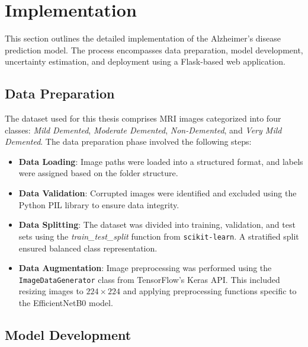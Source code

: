 \documentclass[12pt,onecolumn]{report}
\begin{document}
\section{Implementation}
\label{sec:implementation}

This section outlines the detailed implementation of the Alzheimer's disease prediction model. The process encompasses data preparation, model development, uncertainty estimation, and deployment using a Flask-based web application.

\subsection{Data Preparation}
The dataset used for this thesis comprises MRI images categorized into four classes: \textit{Mild Demented}, \textit{Moderate Demented}, \textit{Non-Demented}, and \textit{Very Mild Demented}. The data preparation phase involved the following steps:
\begin{itemize}
    \item \textbf{Data Loading}: Image paths were loaded into a structured format, and labels were assigned based on the folder structure.
    \item \textbf{Data Validation}: Corrupted images were identified and excluded using the Python PIL library to ensure data integrity.
    \item \textbf{Data Splitting}: The dataset was divided into training, validation, and test sets using the \textit{train\_test\_split} function from \texttt{scikit-learn}. A stratified split ensured balanced class representation.
    \item \textbf{Data Augmentation}: Image preprocessing was performed using the \texttt{ImageDataGenerator} class from TensorFlow's Keras API. This included resizing images to \(224 \times 224\) and applying preprocessing functions specific to the EfficientNetB0 model.
\end{itemize}

\subsection{Model Development}
\end{document}
